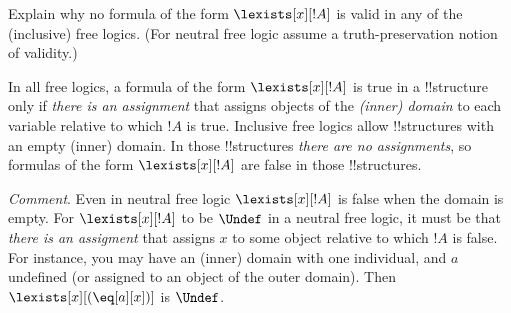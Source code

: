 \documentclass[../../../../include/open-logic-section]{subfiles}
\begin{document}
\begin{prob}[existence]
Explain why no formula of the form $\lexists[x][!A]$ is valid in any
of the (inclusive) free logics. (For neutral free logic assume a truth-preservation
notion of validity.)
\begin{ans}
In all free logics, a formula of the form $\lexists[x][!A]$ is true in a !!{structure}
only if \emph{there is an assignment} that assigns objects of the \emph{(inner) domain} 
to each variable relative to which $!A$ is true. Inclusive free logics allow !!{structure}s
with an empty (inner) domain. In those !!{structure}s \emph{there are no assignments}, so 
formulas of the form $\lexists[x][!A]$ are false in those !!{structure}s. 

\emph{Comment}. Even in neutral free logic  $\lexists[x][!A]$ is false when the domain 
is empty. For $\lexists[x][!A]$ to be $\Undef$ in a neutral free logic, it must be that 
\emph{there is an
assigment} that assigns $x$ to some object relative to which $!A$ is false. For instance, 
you may have an (inner) domain with one individual, and $a$ undefined (or assigned to an 
object of the outer domain). Then $\lexists[x][(\eq[a][x])]$ is $\Undef$.  
\end{ans}
\end{prob}
\end{document}
